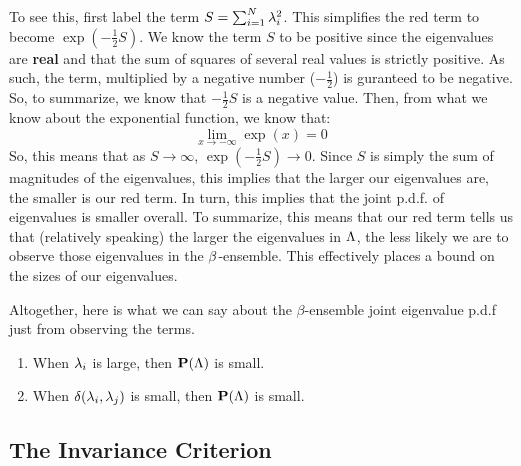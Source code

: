 To see this, first label the term $S = \sum_{i = 1}^N \lambda_i^2$. This simplifies the red term to become $\exp(-\frac{1}{2} S)$.
We know the term $S$ to be positive since the eigenvalues are \textbf{real} and that the sum of squares of several real values is strictly positive.
As such, the term, multiplied by a negative number ($-\frac{1}{2}$) is guranteed to be negative. So, to summarize, we know that $-\frac{1}{2} S$ is a negative value.
Then, from what we know about the exponential function, we know that:
$$\lim_{x \to -\infty} \exp(x) = 0$$
So, this means that as $S \to \infty$, $\exp(-\frac{1}{2}S) \to 0$. Since $S$ is simply the sum of magnitudes of the eigenvalues, this implies that the larger our eigenvalues
are, the smaller is our red term. In turn, this implies that the joint p.d.f. of eigenvalues is smaller overall.
To summarize, this means that our red term tells us that (relatively speaking) the larger the eigenvalues in $\Lambda$, the less likely we are to observe those eigenvalues in the $\beta$-ensemble. This effectively places a bound on the sizes of our eigenvalues.

\bigskip

 Altogether, here is what we can say about the $\beta$-ensemble joint eigenvalue p.d.f just from observing the terms.
  \begin{enumerate}
    \item When $\lambda_i$ is large, then $\textbf{P}(\Lambda)$ is small.
    \item When $\delta(\lambda_i, \lambda_j)$ is small, then $\textbf{P}(\Lambda)$ is small.
  \end{enumerate}

\newpage
\subsection{The Invariance Criterion}


